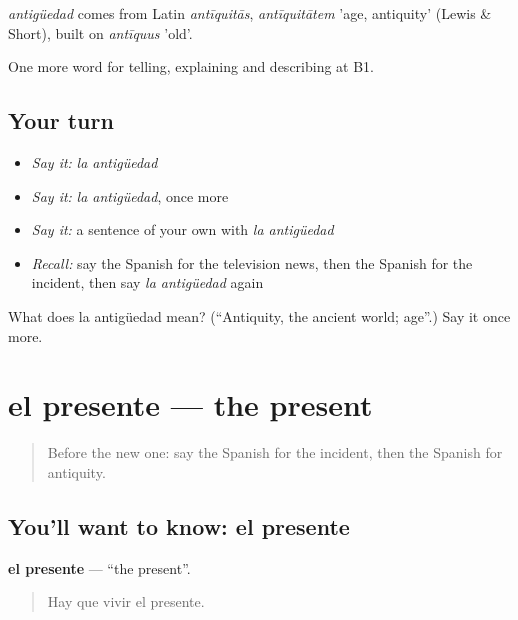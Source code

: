 \begin{cousinweb}
\emph{antigüedad} comes from Latin \emph{antīquitās}, \emph{antīquitātem} 'age, antiquity' (Lewis \& Short), built on \emph{antīquus} 'old'.
\end{cousinweb}

\begin{grammarlens}[title={What you've built}]
One more word for telling, explaining and describing at B1.
\end{grammarlens}

\subsection*{Your turn}
\begin{itemize}
\raggedright
  \item \emph{Say it:} \emph{la antigüedad}
  \item \emph{Say it:} \emph{la antigüedad}, once more
  \item \emph{Say it:} a sentence of your own with \emph{la antigüedad}
  \item \emph{Recall:} say the Spanish for the television news, then the Spanish for the incident, then say \emph{la antigüedad} again
\end{itemize}

\begin{tcolorbox}[breakable,colback=teal!4,colframe=teal!35!black,title={Before you move on}]
What does la antigüedad mean? (\textquotedblleft{}Antiquity, the ancient world; age\textquotedblright{}.) Say it once more.
\end{tcolorbox}
\section[el presente]{el presente — the present}

\label{lesson:ES-C575-presente}



\begin{quote}
Before the new one: say the Spanish for the incident, then the Spanish for antiquity.
\end{quote}

\subsection*{You'll want to know: el presente}
\textbf{el presente} — \textquotedblleft{}the present\textquotedblright{}.

\begin{quote}
Hay que vivir el presente.
\end{quote}

